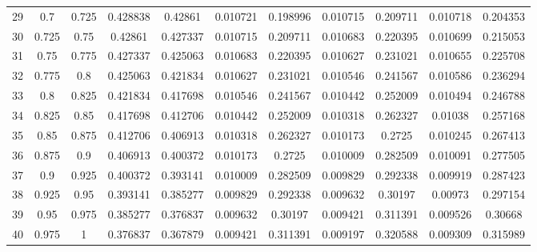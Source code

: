 \documentclass[11pt]{article}
\begin{document}
\begin{table}[H]
{\begin{tabular}{c c c c c c c c c c c}
                29 & 0.7 & 0.725 & 0.428838 & 0.42861 & 0.010721 & 0.198996 & 0.010715 & 0.209711 & 0.010718 & 0.204353 \\
                30 & 0.725 & 0.75 & 0.42861 & 0.427337 & 0.010715 & 0.209711 & 0.010683 & 0.220395 & 0.010699 & 0.215053 \\
                31 & 0.75 & 0.775 & 0.427337 & 0.425063 & 0.010683 & 0.220395 & 0.010627 & 0.231021 & 0.010655 & 0.225708 \\
                32 & 0.775 & 0.8 & 0.425063 & 0.421834 & 0.010627 & 0.231021 & 0.010546 & 0.241567 & 0.010586 & 0.236294 \\
                33 & 0.8 & 0.825 & 0.421834 & 0.417698 & 0.010546 & 0.241567 & 0.010442 & 0.252009 & 0.010494 & 0.246788 \\
                34 & 0.825 & 0.85 & 0.417698 & 0.412706 & 0.010442 & 0.252009 & 0.010318 & 0.262327 & 0.01038 & 0.257168 \\
                35 & 0.85 & 0.875 & 0.412706 & 0.406913 & 0.010318 & 0.262327 & 0.010173 & 0.2725 & 0.010245 & 0.267413 \\
                36 & 0.875 & 0.9 & 0.406913 & 0.400372 & 0.010173 & 0.2725 & 0.010009 & 0.282509 & 0.010091 & 0.277505 \\
                37 & 0.9 & 0.925 & 0.400372 & 0.393141 & 0.010009 & 0.282509 & 0.009829 & 0.292338 & 0.009919 & 0.287423 \\
                38 & 0.925 & 0.95 & 0.393141 & 0.385277 & 0.009829 & 0.292338 & 0.009632 & 0.30197 & 0.00973 & 0.297154 \\
                39 & 0.95 & 0.975 & 0.385277 & 0.376837 & 0.009632 & 0.30197 & 0.009421 & 0.311391 & 0.009526 & 0.30668 \\
                40 & 0.975 & 1 & 0.376837 & 0.367879 & 0.009421 & 0.311391 & 0.009197 & 0.320588 & 0.009309 & 0.315989 \\
                \bottomrule
            \end{tabular}
        }
    \end{table}
\end{document}
